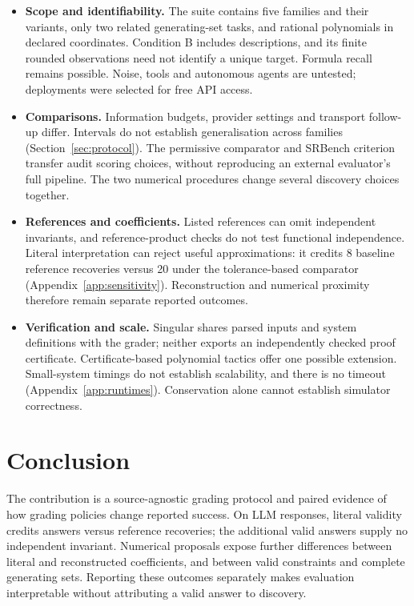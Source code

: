 \documentclass[10pt]{article}
\begin{document}
\begin{itemize}
\item \textbf{Scope and identifiability.} The suite contains five families and their variants, only two related generating-set tasks, and rational polynomials in declared coordinates. Condition B includes descriptions, and its finite rounded observations need not identify a unique target. Formula recall remains possible. Noise, tools and autonomous agents are untested; deployments were selected for free API access.
\item \textbf{Comparisons.} Information budgets, provider settings and transport follow-up differ. Intervals do not establish generalisation across families (Section~\ref{sec:protocol}). The permissive comparator and SRBench criterion transfer audit scoring choices, without reproducing an external evaluator's full pipeline. The two numerical procedures change several discovery choices together.
\item \textbf{References and coefficients.} Listed references can omit independent invariants, and reference-product checks do not test functional independence. Literal interpretation can reject useful approximations: it credits 8 baseline reference recoveries versus 20 under the tolerance-based comparator (Appendix~\ref{app:sensitivity}). Reconstruction and numerical proximity therefore remain separate reported outcomes.
\item \textbf{Verification and scale.} Singular shares parsed inputs and system definitions with the grader; neither exports an independently checked proof certificate. Certificate-based polynomial tactics \citep{shen2026polynomial} offer one possible extension. Small-system timings do not establish scalability, and there is no timeout (Appendix~\ref{app:runtimes}). Conservation alone cannot establish simulator correctness.
\end{itemize}

\section{Conclusion}\label{sec:conclusion}

The contribution is a source-agnostic grading protocol and paired evidence of how grading policies change reported success. On \nLLM{} LLM responses, literal validity credits \nFirstValid{} answers versus \nExact{} reference recoveries; the \nNonReference{} additional valid answers supply no independent invariant. Numerical proposals expose further differences between literal and reconstructed coefficients, and between valid constraints and complete generating sets. Reporting these outcomes separately makes evaluation interpretable without attributing a valid answer to discovery.
\end{document}
